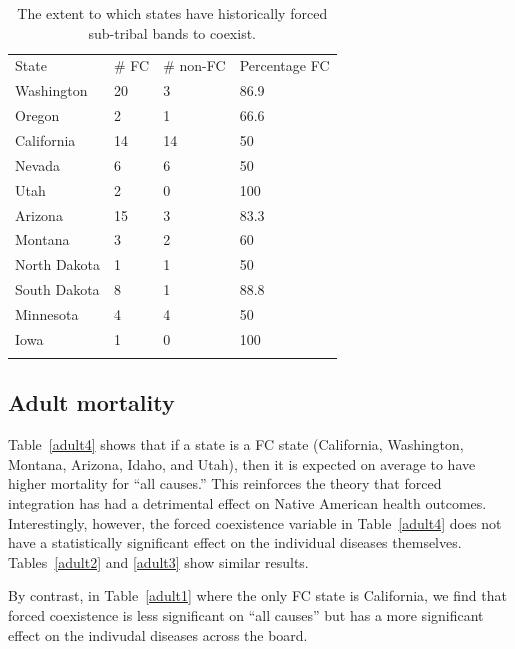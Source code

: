 \documentclass[12pt]{article}
\begin{document}
\begin{table}[ht!]
    \begin{tabular}{llll}
    State        & \# FC & \# non-FC & Percentage FC \\
    Washington   & 20    & 3         & 86.9          \\
    Oregon       & 2     & 1         & 66.6          \\
    California   & 14    & 14        & 50            \\
    Nevada       & 6     & 6         & 50            \\
    Utah         & 2     & 0         & 100           \\
    Arizona      & 15    & 3         & 83.3          \\
    Montana      & 3     & 2         & 60            \\
    North Dakota & 1     & 1         & 50            \\
    South Dakota & 8     & 1         & 88.8          \\
    Minnesota    & 4     & 4         & 50            \\
    Iowa         & 1     & 0         & 100           \\
    \caption{The extent to which states have historically forced sub-tribal bands to coexist.\label{fcpercent}}
    \end{tabular}
\end{table}

\subsection{Adult mortality}
Table~\ref{adult4} shows that if a state is a FC state (California, Washington, Montana, Arizona, Idaho, and Utah), then it is expected on average to have higher mortality for ``all causes.'' 
This reinforces the theory that forced integration has had a detrimental effect on Native American health outcomes. 
Interestingly, however, the forced coexistence variable in Table~\ref{adult4} does not have a statistically significant effect on the individual diseases themselves. 
Tables~\ref{adult2} and \ref{adult3} show similar results.

By contrast, in Table~\ref{adult1} where the only FC state is California, we find that forced coexistence is less significant on ``all causes'' but has a more significant effect on the indivudal diseases across the board.

\end{document}
